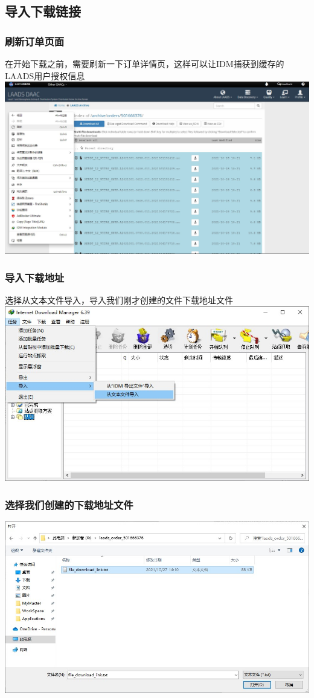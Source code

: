 \subsection{导入下载链接}
\begin{frame}
    \frametitle{刷新订单页面}
    在开始下载之前，需要刷新一下订单详情页，这样可以让IDM捕获到缓存的LAADS用户授权信息
    \includegraphics[width=\linewidth]{images/37.刷新一下订单页面.jpg}
\end{frame}
\begin{frame}
    \frametitle{导入下载地址}
    选择从文本文件导入，导入我们刚才创建的文件下载地址文件
    \includegraphics[width=\linewidth]{images/35.导入下载链地址}
\end{frame}
\begin{frame}
    \frametitle{选择我们创建的下载地址文件}
    \includegraphics[width=\linewidth]{images/36.选择下载链接文件}
\end{frame}
